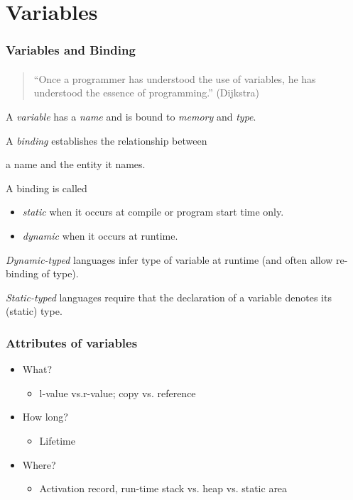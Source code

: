 \documentclass{beamer}
\begin{document}
\section{Variables}
\begin{frame}[fragile]
\frametitle{Variables and Binding}
\framesubtitle{}
\begin{quote}\small
``Once a programmer has understood the use of variables, he has
understood the essence of programming.'' (Dijkstra)
\end{quote}
\medskip

A \emph{variable} has a \emph{name} and is bound to \emph{memory} and
\emph{type}.

\begin{definition}[Binding]
  A \emph{binding} establishes the relationship between
  \begin{center} a name and the entity it names.\end{center}

  A binding is called 
  \begin{itemize}
  \item \emph{static} when it occurs at compile or program
    start time only.
  \item \emph{dynamic} when it occurs at runtime.
  \end{itemize} 
\end{definition}

\medskip
\emph{Dynamic-typed} languages infer type of variable at runtime (and
often allow re-binding of type). 
\smallskip\pause

\emph{Static-typed} languages require that the declaration of a
variable denotes its (static) type. 

\end{frame}

\begin{frame}[fragile]
\frametitle{Attributes of variables}



\begin{itemize}
\item What?
\begin{itemize}
\item l-value vs.r-value; copy vs. reference
\end{itemize}
\item How long?

\begin{itemize}
\item Lifetime 
\end{itemize}
\item Where? 
\begin{itemize}
\item Activation record, run-time stack vs. heap vs. static area
\end{itemize}
\end{itemize}

\end{frame}
\end{document}
